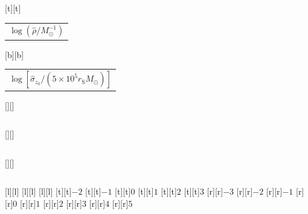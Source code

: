 %    
%
%
\begin{psfrags}%
\psfragscanon%
%
[t][t]{\color[rgb]{0,0,0}\setlength{\tabcolsep}{0pt}\begin{tabular}{c}{\Large$\log\left(\hat{\rho}/M_\odot^{-1}\right)$}\end{tabular}}%
[b][b]{\color[rgb]{0,0,0}\setlength{\tabcolsep}{0pt}\begin{tabular}{c}{\Large$\log\left[\hat{\sigma}_{z_0}/\left(5 \times 10^5 r_\mathrm{S} M_\odot\right)\right]$}\end{tabular}}%
[][]{\color[rgb]{0,0,0}\setlength{\tabcolsep}{0pt}\begin{tabular}{c} \end{tabular}}%
[][]{\color[rgb]{0,0,0}\setlength{\tabcolsep}{0pt}\begin{tabular}{c} \end{tabular}}%
[][]{\color[rgb]{0,0,0}\setlength{\tabcolsep}{0pt}\begin{tabular}{c} \end{tabular}}%
[l][l]{\color[rgb]{0,0,0}{\large$\iota = \pi/12$}}%
[l][l]{\color[rgb]{0,0,0}{\large$\iota = \pi/4$}}%
[l][l]{\color[rgb]{0,0,0}{\large$\iota = 5\pi/12$}}%
%
[t][t]{$-2$}%
[t][t]{$-1$}%
[t][t]{$0$}%
[t][t]{$1$}%
[t][t]{$2$}%
[t][t]{$3$}%
%
[r][r]{$-3$}%
[r][r]{$-2$}%
[r][r]{$-1$}%
[r][r]{$0$}%
[r][r]{$1$}%
[r][r]{$2$}%
[r][r]{$3$}%
[r][r]{$4$}%
[r][r]{$5$}%
%
%
\end{psfrags}%
%
